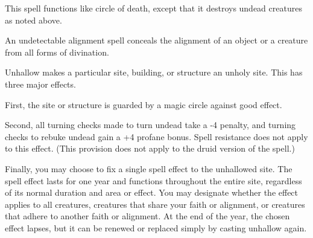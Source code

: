 \begin{multicols}{2}
\begin{small}

\noindent This spell functions like circle of death, except that it destroys undead creatures as noted above.


\noindent An undetectable alignment spell conceals the alignment of an object or a creature from all forms of divination.

\noindent Unhallow makes a particular site, building, or structure an unholy site. This has three major effects.

\smallskip\noindent First, the site or structure is guarded by a magic circle against good effect.

\smallskip\noindent Second, all turning checks made to turn undead take a -4 penalty, and turning checks to rebuke undead gain a +4 profane bonus. Spell resistance does not apply to this effect. (This provision does not apply to the druid version of the spell.)

\smallskip\noindent Finally, you may choose to fix a single spell effect to the unhallowed site. The spell effect lasts for one year and functions throughout the entire site, regardless of its normal duration and area or effect. You may designate whether the effect applies to all creatures, creatures that share your faith or alignment, or creatures that adhere to another faith or alignment. At the end of the year, the chosen effect lapses, but it can be renewed or replaced simply by casting unhallow again.


\end{small}
\end{multicols}
